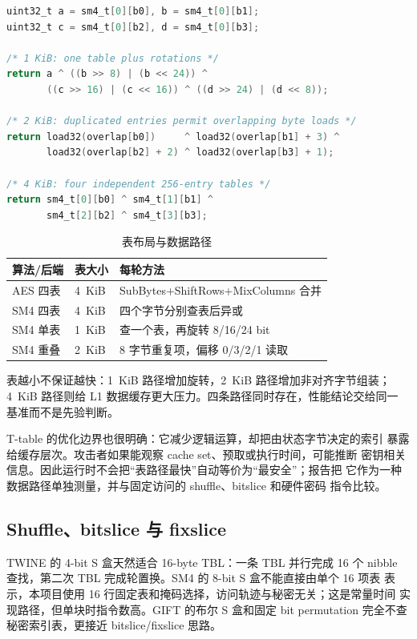 \documentclass[11pt,a4paper,UTF8,fontset=none]{ctexart}
\begin{document}
\begin{lstlisting}[language=C,caption={SM4 三种 T-table 数据路径（src/sm4.c）}]
uint32_t a = sm4_t[0][b0], b = sm4_t[0][b1];
uint32_t c = sm4_t[0][b2], d = sm4_t[0][b3];

/* 1 KiB: one table plus rotations */
return a ^ ((b >> 8) | (b << 24)) ^
       ((c >> 16) | (c << 16)) ^ ((d >> 24) | (d << 8));

/* 2 KiB: duplicated entries permit overlapping byte loads */
return load32(overlap[b0])     ^ load32(overlap[b1] + 3) ^
       load32(overlap[b2] + 2) ^ load32(overlap[b3] + 1);

/* 4 KiB: four independent 256-entry tables */
return sm4_t[0][b0] ^ sm4_t[1][b1] ^
       sm4_t[2][b2] ^ sm4_t[3][b3];
\end{lstlisting}

\begin{table}[htbp]
\centering
\caption{表布局与数据路径}
\begin{tabular}{lll}
\toprule
算法/后端 & 表大小 & 每轮方法\\
\midrule
AES 四表 & 4~KiB & SubBytes+ShiftRows+MixColumns 合并\\
SM4 四表 & 4~KiB & 四个字节分别查表后异或\\
SM4 单表 & 1~KiB & 查一个表，再旋转 8/16/24 bit\\
SM4 重叠 & 2~KiB & 8 字节重复项，偏移 0/3/2/1 读取\\
\bottomrule
\end{tabular}
\end{table}

表越小不保证越快：1~KiB 路径增加旋转，2~KiB 路径增加非对齐字节组装；
4~KiB 路径则给 L1 数据缓存更大压力。四条路径同时存在，性能结论交给同一
基准而不是先验判断。

T-table 的优化边界也很明确：它减少逻辑运算，却把由状态字节决定的索引
暴露给缓存层次。攻击者如果能观察 cache set、预取或执行时间，可能推断
密钥相关信息。因此运行时不会把“表路径最快”自动等价为“最安全”；报告把
它作为一种数据路径单独测量，并与固定访问的 shuffle、bitslice 和硬件密码
指令比较。

\subsection{Shuffle、bitslice 与 fixslice}

TWINE 的 4-bit S 盒天然适合 16-byte TBL：一条 TBL 并行完成 16 个 nibble
查找，第二次 TBL 完成轮置换。SM4 的 8-bit S 盒不能直接由单个 16 项表
表示，本项目使用 16 行固定表和掩码选择，访问轨迹与秘密无关；这是常量时间
实现路径，但单块时指令数高。GIFT 的布尔 S 盒和固定 bit permutation
完全不查秘密索引表，更接近 bitslice/fixslice 思路。
\end{document}
